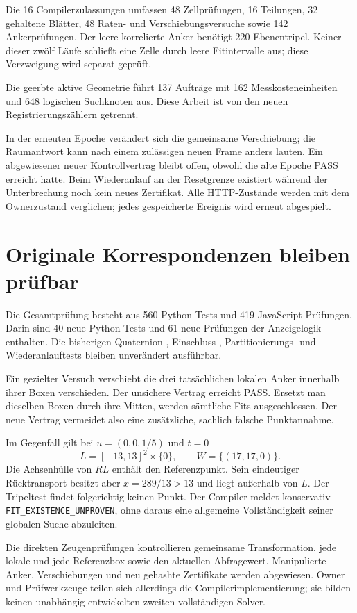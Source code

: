 \documentclass[11pt,a4paper]{article}
\newcommand{\nextsection}[2]{\clearpage{\color{accent}\small\textsf{#1}}\section{#2}}
\begin{document}
Die 16 Compilerzulassungen umfassen 48 Zellprüfungen, 16 Teilungen,
32 gehaltene Blätter, 48 Raten- und Verschiebungsversuche sowie
142 Ankerprüfungen. Der leere korrelierte Anker benötigt 220
Ebenentripel. Keiner dieser zwölf Läufe schließt eine Zelle durch
leere Fitintervalle aus; diese Verzweigung wird separat geprüft.

Die geerbte aktive Geometrie führt 137 Aufträge mit
162 Messkosteneinheiten und 648 logischen Suchknoten aus.
Diese Arbeit ist von den neuen Registrierungszählern getrennt.

In der erneuten Epoche verändert sich die gemeinsame Verschiebung;
die Raumantwort kann nach einem zulässigen neuen Frame anders
lauten. Ein abgewiesener neuer Kontrollvertrag bleibt offen,
obwohl die alte Epoche PASS erreicht hatte. Beim Wiederanlauf an
der Resetgrenze existiert während der Unterbrechung noch kein
neues Zertifikat. Alle HTTP-Zustände werden mit dem Ownerzustand
verglichen; jedes gespeicherte Ereignis wird erneut abgespielt.

\nextsection{112 / VERIFIKATION UND ANZEIGE}{Originale Korrespondenzen bleiben prüfbar}
Die Gesamtprüfung besteht aus 560 Python-Tests und 419
JavaScript-Prüfungen. Darin sind 40 neue Python-Tests und 61
neue Prüfungen der Anzeigelogik enthalten. Die bisherigen
Quaternion-, Einschluss-, Partitionierungs- und Wiederanlauftests
bleiben unverändert ausführbar.

Ein gezielter Versuch verschiebt die drei tatsächlichen lokalen
Anker innerhalb ihrer Boxen verschieden. Der unsichere Vertrag
erreicht PASS. Ersetzt man dieselben Boxen durch ihre Mitten,
werden sämtliche Fits ausgeschlossen. Der neue Vertrag vermeidet
also eine zusätzliche, sachlich falsche Punktannahme.

Im Gegenfall gilt bei $u=(0,0,1/5)$ und $t=0$
\[
 L=[-13,13]^2\times\{0\},\qquad W=\{(17,17,0)\}.
\]
Die Achsenhülle von $RL$ enthält den Referenzpunkt. Sein eindeutiger
Rücktransport besitzt aber $x=289/13>13$ und liegt außerhalb von $L$.
Der Tripeltest findet folgerichtig keinen Punkt. Der Compiler
meldet konservativ \texttt{FIT\_EXISTENCE\_UNPROVEN}, ohne daraus
eine allgemeine Vollständigkeit seiner globalen Suche abzuleiten.

Die direkten Zeugenprüfungen kontrollieren gemeinsame Transformation,
jede lokale und jede Referenzbox sowie den aktuellen Abfragewert.
Manipulierte Anker, Verschiebungen und neu gehashte Zertifikate
werden abgewiesen. Owner und Prüfwerkzeuge teilen sich allerdings
die Compilerimplementierung; sie bilden keinen unabhängig
entwickelten zweiten vollständigen Solver.
\end{document}
